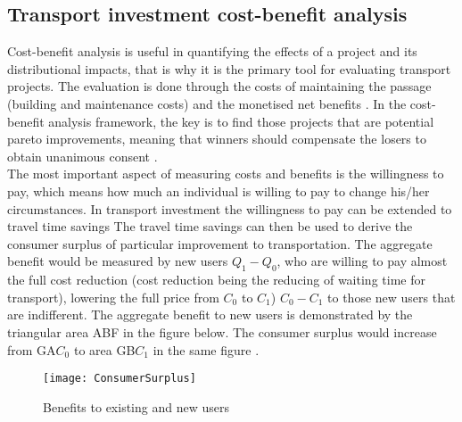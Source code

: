 \subsection{Transport investment cost-benefit analysis}

Cost-benefit analysis is useful in quantifying the effects of a project and its distributional impacts, that is why it is the primary tool for evaluating transport projects. The evaluation is done through the costs of maintaining the passage (building and maintenance costs) and the monetised net benefits \citep{liikenne}. In the cost-benefit analysis framework, the key is to find those projects that are potential pareto improvements, meaning that winners should compensate the losers to obtain unanimous consent \citep{small}. \\

The most important aspect of measuring costs and benefits is the willingness to pay, which means how much an individual is willing to pay to change his/her circumstances. In transport investment the willingness to pay can be extended to travel time savings \citep{small} The travel time savings can then be used to derive the consumer surplus of particular improvement to transportation. The aggregate benefit would be measured by new users \(Q_1 - Q_0\), who are willing to pay almost the full cost reduction (cost reduction being the reducing of waiting time for transport), lowering the full price from \(C_0\) to \(C_1\))   \(C_0 - C_1\) to those new users that are indifferent. The aggregate benefit to new users is demonstrated by the triangular area ABF in the figure below. The consumer surplus would increase from GA\(C_0\) to area GB\(C_1\) in the same figure \citep{small}. \\

\begin{figure}[H]
\centering
\texttt{[image: ConsumerSurplus]}
\caption{Benefits to existing and new users \citep{small}}
\label{fig:ConsumerSurplus}
\end{figure} 
 

